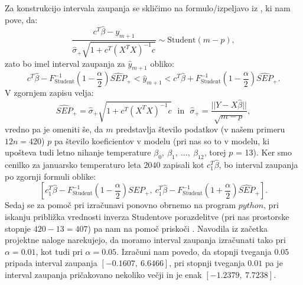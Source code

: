 \documentclass{article}
\begin{document}
Za konstrukcijo intervala zaupanja se skličimo na formulo/izpeljavo iz \cite{lin_reg}, ki nam pove, da:
$$
    \frac{c^T\hat{\beta} - y_{m+1}}{\hat{\sigma}_{+}\sqrt{1 + c^T(X^TX)^{-1}c}} \sim \text{Student}(m-p), 
$$
zato bo imel interval zaupanja za $\hat{y}_{m+1}$ obliko:
$$
    c^T\hat{\beta} - F^{-1}_{\text{Student}}\left(1 - \frac{\alpha}{2}\right)\widehat{SEP}_{+} < \hat{y}_{m+1} < c^T\hat{\beta} + F^{-1}_{\text{Student}}\left(1 - \frac{\alpha}{2}\right)\widehat{SEP}_{+}.
$$
V zgornjem zapisu velja:
$$
\widehat{SEP}_{+}  = \hat{\sigma}_{+}\sqrt{1 + c^T(X^TX)^{-1}c}~~~\text{in}~~~\hat{\sigma}_{+} = \frac{||Y - X\hat{\beta}||}{\sqrt{m - p}},
$$
vredno pa je omeniti še, da $m$ predstavlja število podatkov (v našem primeru $12n = 420$) $p$ pa število koeficientov v modelu (pri nas so to v modelu, ki upošteva tudi letno nihanje temperature $\beta_0,~\beta_1,~\dots,~\beta_{12}$, torej $p$ = 13).
\newline
Ker smo cenilko za januarsko temperaturo leta $2040$ zapisali kot $c_1^T \hat{\beta}$, bo interval zaupanja po zgornji formuli oblike:
$$
\left[c_1^T\hat{\beta} - F^{-1}_{\text{Student}}\left(1 - \frac{\alpha}{2}\right)\widehat{SEP}_{+} ,~c_1^T\hat{\beta} - F^{-1}_{\text{Student}}\left(1 + \frac{\alpha}{2}\right)\widehat{SEP}_{+} \right].
$$
Sedaj se za pomoč pri izračunavi ponovno obrnemo na program $python$, pri iskanju približka vrednosti inverza Studentove porazdelitve (pri nas prostorske stopnje $420 - 13 = 407$) pa nam na pomoč priskoči \cite{student}. 
Navodila iz začetka projektne naloge narekujejo, da moramo interval zaupanja izračunati tako pri $\alpha = 0.01$, kot tudi pri $\alpha = 0.05$. 
Izračuni nam povedo, da stopnji tveganja $0.05$ pripada interval zaupanja $[-0.1607,~6.6466]$, pri stopnji tveganja $0.01$ pa je interval zaupanja pričakovano nekoliko večji in je enak $[-1.2379,~7.7238]$.
\end{document}
